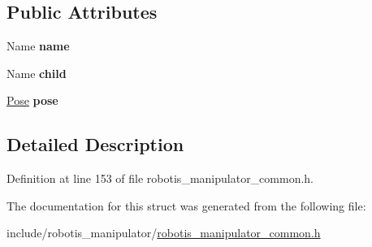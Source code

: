 \subsection*{Public Attributes}
\begin{DoxyCompactItemize}
\item 
Name {\bfseries name}\hypertarget{structrobotis__manipulator_1_1___world_af43933dcaaed1760c3adc6050149f8b0}{}\label{structrobotis__manipulator_1_1___world_af43933dcaaed1760c3adc6050149f8b0}

\item 
Name {\bfseries child}\hypertarget{structrobotis__manipulator_1_1___world_a814bde4e90579fef3c41bc671cf716d7}{}\label{structrobotis__manipulator_1_1___world_a814bde4e90579fef3c41bc671cf716d7}

\item 
\hyperlink{structrobotis__manipulator_1_1___task_waypoint}{Pose} {\bfseries pose}\hypertarget{structrobotis__manipulator_1_1___world_a1abd8b7a78440bd791b5235c21031560}{}\label{structrobotis__manipulator_1_1___world_a1abd8b7a78440bd791b5235c21031560}

\end{DoxyCompactItemize}


\subsection{Detailed Description}


Definition at line 153 of file robotis\+\_\+manipulator\+\_\+common.\+h.



The documentation for this struct was generated from the following file\+:\begin{DoxyCompactItemize}
\item 
include/robotis\+\_\+manipulator/\hyperlink{robotis__manipulator__common_8h}{robotis\+\_\+manipulator\+\_\+common.\+h}\end{DoxyCompactItemize}
